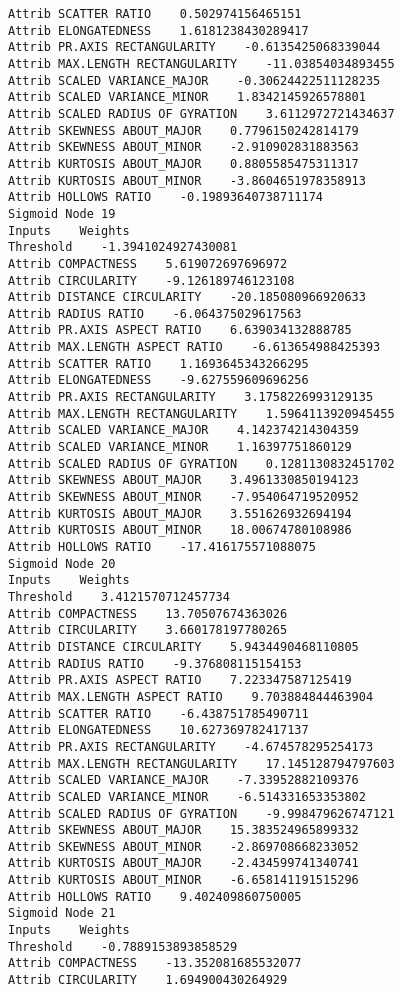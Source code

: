 \documentclass[
	article,			%
	11pt,				%
	oneside,			%
	a4paper,			%
	english,			%
	brazil,				%
	sumario=tradicional
	]{abntex2}
\begin{document}
\begin{lstlisting}
Attrib SCATTER RATIO    0.502974156465151
Attrib ELONGATEDNESS    1.6181238430289417
Attrib PR.AXIS RECTANGULARITY    -0.6135425068339044
Attrib MAX.LENGTH RECTANGULARITY    -11.03854034893455
Attrib SCALED VARIANCE_MAJOR    -0.30624422511128235
Attrib SCALED VARIANCE_MINOR    1.8342145926578801
Attrib SCALED RADIUS OF GYRATION    3.6112972721434637
Attrib SKEWNESS ABOUT_MAJOR    0.7796150242814179
Attrib SKEWNESS ABOUT_MINOR    -2.910902831883563
Attrib KURTOSIS ABOUT_MAJOR    0.8805585475311317
Attrib KURTOSIS ABOUT_MINOR    -3.8604651978358913
Attrib HOLLOWS RATIO    -0.19893640738711174
Sigmoid Node 19
Inputs    Weights
Threshold    -1.3941024927430081
Attrib COMPACTNESS    5.619072697696972
Attrib CIRCULARITY    -9.126189746123108
Attrib DISTANCE CIRCULARITY    -20.185080966920633
Attrib RADIUS RATIO    -6.064375029617563
Attrib PR.AXIS ASPECT RATIO    6.639034132888785
Attrib MAX.LENGTH ASPECT RATIO    -6.613654988425393
Attrib SCATTER RATIO    1.1693645343266295
Attrib ELONGATEDNESS    -9.627559609696256
Attrib PR.AXIS RECTANGULARITY    3.1758226993129135
Attrib MAX.LENGTH RECTANGULARITY    1.5964113920945455
Attrib SCALED VARIANCE_MAJOR    4.142374214304359
Attrib SCALED VARIANCE_MINOR    1.16397751860129
Attrib SCALED RADIUS OF GYRATION    0.1281130832451702
Attrib SKEWNESS ABOUT_MAJOR    3.4961330850194123
Attrib SKEWNESS ABOUT_MINOR    -7.954064719520952
Attrib KURTOSIS ABOUT_MAJOR    3.551626932694194
Attrib KURTOSIS ABOUT_MINOR    18.00674780108986
Attrib HOLLOWS RATIO    -17.416175571088075
Sigmoid Node 20
Inputs    Weights
Threshold    3.4121570712457734
Attrib COMPACTNESS    13.70507674363026
Attrib CIRCULARITY    3.660178197780265
Attrib DISTANCE CIRCULARITY    5.9434490468110805
Attrib RADIUS RATIO    -9.376808115154153
Attrib PR.AXIS ASPECT RATIO    7.223347587125419
Attrib MAX.LENGTH ASPECT RATIO    9.703884844463904
Attrib SCATTER RATIO    -6.438751785490711
Attrib ELONGATEDNESS    10.627369782417137
Attrib PR.AXIS RECTANGULARITY    -4.674578295254173
Attrib MAX.LENGTH RECTANGULARITY    17.145128794797603
Attrib SCALED VARIANCE_MAJOR    -7.33952882109376
Attrib SCALED VARIANCE_MINOR    -6.514331653353802
Attrib SCALED RADIUS OF GYRATION    -9.998479626747121
Attrib SKEWNESS ABOUT_MAJOR    15.383524965899332
Attrib SKEWNESS ABOUT_MINOR    -2.869708668233052
Attrib KURTOSIS ABOUT_MAJOR    -2.434599741340741
Attrib KURTOSIS ABOUT_MINOR    -6.658141191515296
Attrib HOLLOWS RATIO    9.402409860750005
Sigmoid Node 21
Inputs    Weights
Threshold    -0.7889153893858529
Attrib COMPACTNESS    -13.352081685532077
Attrib CIRCULARITY    1.694900430264929

\end{lstlisting}
\end{document}
